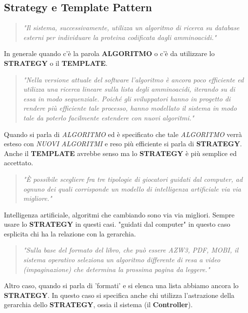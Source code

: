 \documentclass[a4paper,11pt]{article}
\begin{document}
\newpage
	\subsection{Strategy e Template Pattern}
	
	\begin{quote}
		\textit{"Il sistema, successivamente, utilizza un algoritmo di ricerca su database esterni per individuare la proteina codificata dagli amminoacidi."}
	\end{quote}
	
	In generale quando c'è la parola \textbf{ALGORITMO} o c'è da utilizzare lo \textbf{STRATEGY} o il \textbf{TEMPLATE}.
	
	\begin{quote}
		\textit{"Nella versione attuale del software l'algoritmo è ancora poco efficiente ed  utilizza una ricerca lineare sulla lista degli amminoacidi, iterando su di essa in modo  sequenziale. Poiché gli sviluppatori hanno in progetto di rendere più efficiente tale  processo, hanno modellato il sistema in modo tale da poterlo facilmente estendere con nuovi algoritmi."}
	\end{quote}
	
	Quando si parla di \textit{ALGORITMO} ed è specificato che tale \textit{ALGORITMO} verrà esteso con \textit{NUOVI ALGORITMI} e reso più efficiente si parla di \textbf{STRATEGY}. Anche il \textbf{TEMPLATE} avrebbe senso ma lo \textbf{STRATEGY} è più semplice ed accettato.
	
	\begin{quote}
		\textit{"È possibile scegliere fra tre tipologie di giocatori guidati dal computer, ad ognuno dei quali corrisponde un modello di intelligenza artificiale via via migliore."}
	\end{quote}
	
	Intelligenza artificiale, algoritmi che cambiando sono via via migliori. Sempre usare lo \textbf{STRATEGY} in questi casi. "guidati dal computer" in questo caso esplicita chi ha la relazione con la gerarchia.
	
	\begin{quote}
		\textit{"Sulla base del formato del libro, che può essere AZW3, PDF, MOBI, il sistema operativo seleziona un algoritmo differente di resa a video (impaginazione) che determina la prossima pagina da leggere."}
	\end{quote}
	
	Altro caso, quando si parla di 'formati' e si elenca una lista abbiamo ancora lo \textbf{STRATEGY}. In questo caso si specifica anche chi utilizza l'astrazione della gerarchia dello \textbf{STRATEGY}, ossia il sistema (il \textbf{Controller}).
	
\end{document}
